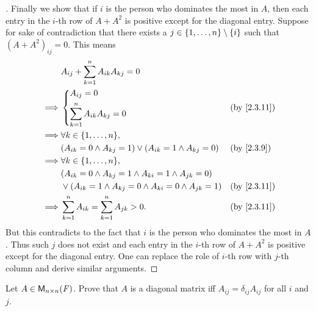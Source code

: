\begin{proof}[]
  Finally we show that if \(i\) is the person who dominates the most in \(A\), then each entry in the \(i\)-th row of \(A + A^2\) is positive except for the diagonal entry.
  Suppose for sake of contradiction that there exists a \(j \in \left\lbrace1, \dots, n\right\rbrace \setminus \left\lbrace i\right\rbrace\) such that \((A + A^2)_{i j} = 0\).
  This means
  \begin{align*}
             & A_{i j} + \sum_{k = 1}^n A_{i k} A_{k j} = 0                                              \\
    \implies & \begin{dcases}
                 A_{i j} = 0 \\
                 \sum_{k = 1}^n A_{i k} A_{k j} = 0
               \end{dcases}                                       &  & \by{2.3.11}                       \\
    \implies & \forall k \in \set{1, \dots, n},                                                          \\
             & (A_{i k} = 0 \land A_{k j} = 1) \lor (A_{i k} = 1 \land A_{k j} = 0)     &  & \by{2.3.9}  \\
    \implies & \forall k \in \set{1, \dots, n},                                                          \\
             & (A_{i k} = 0 \land A_{k j} = 1 \land A_{k i} = 1 \land A_{j k} = 0)                       \\
             & \lor (A_{i k} = 1 \land A_{k j} = 0 \land A_{k i} = 0 \land A_{j k} = 1) &  & \by{2.3.11} \\
    \implies & \sum_{k = 1}^n A_{i k} = \sum_{k = 1}^n A_{j k} > 0.                     &  & \by{2.3.11}
  \end{align*}
  But this contradicts to the fact that \(i\) is the person who dominates the most in \(A\).
  Thus such \(j\) does not exist and each entry in the \(i\)-th row of \(A + A^2\) is positive except for the diagonal entry.
  One can replace the role of \(i\)-th row with \(j\)-th column and derive similar arguments.
\end{proof}

\exercisesection

\setcounter{ex}{9}
\begin{ex}\label{ex:2.3.10}
  Let \(A \in \ms[n][n][\F]\).
  Prove that \(A\) is a diagonal matrix iff \(A_{i j} = \delta_{i j} A_{i j}\) for all \(i\) and \(j\).
\end{ex}

